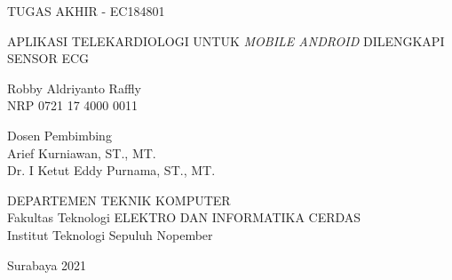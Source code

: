 TUGAS AKHIR - EC184801

\vspace{6ex}

\begin{large}
  APLIKASI TELEKARDIOLOGI UNTUK \textit{MOBILE ANDROID} DILENGKAPI SENSOR ECG
\end{large}

\vspace{4ex}

Robby Aldriyanto Raffly \\
NRP 0721 17 4000 0011

\vspace{2ex}

Dosen Pembimbing \\
Arief Kurniawan, ST., MT.\\
Dr. I Ketut Eddy Purnama, ST., MT.

\vspace{6ex}

DEPARTEMEN TEKNIK KOMPUTER \\
Fakultas Teknologi ELEKTRO DAN INFORMATIKA CERDAS \\
Institut Teknologi Sepuluh Nopember

Surabaya 2021
